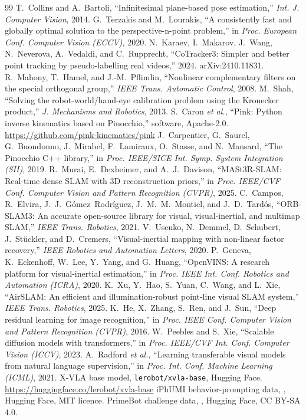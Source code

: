 \documentclass[conference,10pt]{IEEEtran}
\begin{document}
\begin{thebibliography}{99}
 T.~Collins and A.~Bartoli, ``Infinitesimal plane-based pose estimation,'' \emph{Int. J. Computer
Vision}, 2014.
 G.~Terzakis and M.~Lourakis, ``A consistently fast and globally optimal solution to the
perspective-n-point problem,'' in \emph{Proc. European Conf. Computer Vision (ECCV)}, 2020.
 N.~Karaev, I.~Makarov, J.~Wang, N.~Neverova, A.~Vedaldi, and C.~Rupprecht, ``CoTracker3:
Simpler and better point tracking by pseudo-labelling real videos,'' 2024. arXiv:2410.11831.
 R.~Mahony, T.~Hamel, and J.-M.~Pflimlin, ``Nonlinear complementary filters on the special
orthogonal group,'' \emph{IEEE Trans. Automatic Control}, 2008.
 M.~Shah, ``Solving the robot-world/hand-eye calibration problem using the Kronecker
product,'' \emph{J. Mechanisms and Robotics}, 2013.
 S.~Caron \emph{et al.}, ``Pink: Python inverse kinematics based on Pinocchio,'' software, Apache-2.0.
\url{https://github.com/pink-kinematics/pink}
 J.~Carpentier, G.~Saurel, G.~Buondonno, J.~Mirabel, F.~Lamiraux, O.~Stasse, and
N.~Mansard, ``The Pinocchio C++ library,'' in \emph{Proc. IEEE/SICE Int. Symp. System Integration (SII)}, 2019.
 R.~Murai, E.~Dexheimer, and A.~J.~Davison, ``MASt3R-SLAM: Real-time dense SLAM with 3D
reconstruction priors,'' in \emph{Proc. IEEE/CVF Conf. Computer Vision and Pattern Recognition (CVPR)}, 2025.
 C.~Campos, R.~Elvira, J.~J.~G\'omez~Rodr\'iguez, J.~M.~M.~Montiel, and J.~D.~Tard\'os,
``ORB-SLAM3: An accurate open-source library for visual, visual-inertial, and multimap SLAM,'' \emph{IEEE Trans. Robotics},
2021.
 V.~Usenko, N.~Demmel, D.~Schubert, J.~St\"uckler, and D.~Cremers, ``Visual-inertial mapping with
non-linear factor recovery,'' \emph{IEEE Robotics and Automation Letters}, 2020.
 P.~Geneva, K.~Eckenhoff, W.~Lee, Y.~Yang, and G.~Huang, ``OpenVINS: A research platform for
visual-inertial estimation,'' in \emph{Proc. IEEE Int. Conf. Robotics and Automation (ICRA)}, 2020.
 K.~Xu, Y.~Hao, S.~Yuan, C.~Wang, and L.~Xie, ``AirSLAM: An efficient and illumination-robust
point-line visual SLAM system,'' \emph{IEEE Trans. Robotics}, 2025.
 K.~He, X.~Zhang, S.~Ren, and J.~Sun, ``Deep residual learning for image recognition,'' in
\emph{Proc. IEEE Conf. Computer Vision and Pattern Recognition (CVPR)}, 2016.
 W.~Peebles and S.~Xie, ``Scalable diffusion models with transformers,'' in \emph{Proc. IEEE/CVF
Int. Conf. Computer Vision (ICCV)}, 2023.
 A.~Radford \emph{et al.}, ``Learning transferable visual models from natural language
supervision,'' in \emph{Proc. Int. Conf. Machine Learning (ICML)}, 2021.
 X-VLA base model, \texttt{lerobot/xvla-base}, Hugging Face. \url{https://huggingface.co/lerobot/xvla-base}
 iPhUMI behavior-prompting data, , Hugging Face, MIT licence.
 PrimeBot challenge data, , Hugging Face, CC BY-SA 4.0.
\end{thebibliography}
\end{document}
